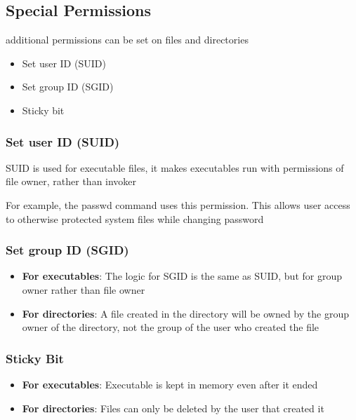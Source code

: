 \documentclass{report}
\begin{document}
    \bigbreak \noindent 
    \subsection{Special Permissions}
    \bigbreak {} additional permissions can be set on files and directories
    \begin{itemize}
        \item Set user ID (SUID)
        \item Set group ID (SGID)
        \item Sticky bit
    \end{itemize}

    \bigbreak \noindent 
    \subsubsection{Set user ID (SUID)}
    \bigbreak \noindent 
    \begin{concept}
       SUID is used for executable files, it makes executables run with permissions of file owner, rather than invoker 
    \end{concept}
    \bigbreak \noindent 
    For example, the passwd command uses this permission. This allows user access to otherwise protected system files while changing password

    \pagebreak 
    \subsubsection{Set group ID (SGID)}
    \bigbreak \noindent 
    \begin{concept}
        \begin{itemize}
            \item \textbf{For executables}: The logic for SGID is the same as SUID, but for group owner rather than file owner
            \item \textbf{For directories}: A file created in the directory will be owned by the group owner of the directory, not the group of the user who created the file
        \end{itemize}
    \end{concept}

    \bigbreak \noindent 
    \subsubsection{Sticky Bit}
    \bigbreak \noindent 
    \begin{concept}
       \begin{itemize}
           \item \textbf{For executables}: Executable is kept in memory even after it ended
            \item \textbf{For directories}: Files can only be deleted by the user that created it 
       \end{itemize} 
    \end{concept}
\end{document}
